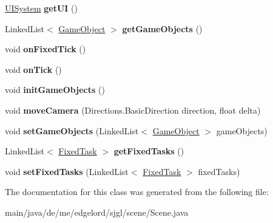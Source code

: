 \begin{DoxyCompactItemize}
\mbox{\label{classde_1_1me_1_1edgelord_1_1sjgl_1_1scene_1_1_scene_a5bc4f5d618ee34be48259de66e0ee12f}} 
\mbox{\hyperlink{classde_1_1me_1_1edgelord_1_1sjgl_1_1ui_1_1_u_i_system}{U\+I\+System}} {\bfseries get\+UI} ()
\item 
\mbox{\label{classde_1_1me_1_1edgelord_1_1sjgl_1_1scene_1_1_scene_a090cfe5919150f584d2a3b18a4631da9}} 
Linked\+List$<$ \mbox{\hyperlink{classde_1_1me_1_1edgelord_1_1sjgl_1_1gameobject_1_1_game_object}{Game\+Object}} $>$ {\bfseries get\+Game\+Objects} ()
\item 
\mbox{\label{classde_1_1me_1_1edgelord_1_1sjgl_1_1scene_1_1_scene_a4c1e106f2d9bc4cb15fc55bd8b204cec}} 
void {\bfseries on\+Fixed\+Tick} ()
\item 
\mbox{\label{classde_1_1me_1_1edgelord_1_1sjgl_1_1scene_1_1_scene_ad83083bf50dc8a921642e61b70fb97bb}} 
void {\bfseries on\+Tick} ()
\item 
\mbox{\label{classde_1_1me_1_1edgelord_1_1sjgl_1_1scene_1_1_scene_aac1110d37956ab61c78e5912aa4da322}} 
void {\bfseries init\+Game\+Objects} ()
\item 
\mbox{\label{classde_1_1me_1_1edgelord_1_1sjgl_1_1scene_1_1_scene_a90d79a8ca3e748c72b0fc9849f409885}} 
void {\bfseries move\+Camera} (Directions.\+Basic\+Direction direction, float delta)
\item 
\mbox{\label{classde_1_1me_1_1edgelord_1_1sjgl_1_1scene_1_1_scene_ae3d9ad47addc8abb9c4d8adcf5429d14}} 
void {\bfseries set\+Game\+Objects} (Linked\+List$<$ \mbox{\hyperlink{classde_1_1me_1_1edgelord_1_1sjgl_1_1gameobject_1_1_game_object}{Game\+Object}} $>$ game\+Objects)
\item 
\mbox{\label{classde_1_1me_1_1edgelord_1_1sjgl_1_1scene_1_1_scene_a49c78b67737988b6636f36b4a773dbbb}} 
Linked\+List$<$ \mbox{\hyperlink{interfacede_1_1me_1_1edgelord_1_1sjgl_1_1gameobject_1_1_fixed_task}{Fixed\+Task}} $>$ {\bfseries get\+Fixed\+Tasks} ()
\item 
\mbox{\label{classde_1_1me_1_1edgelord_1_1sjgl_1_1scene_1_1_scene_a1c11651ff9ca83852eb7a2c3c1f9ff44}} 
void {\bfseries set\+Fixed\+Tasks} (Linked\+List$<$ \mbox{\hyperlink{interfacede_1_1me_1_1edgelord_1_1sjgl_1_1gameobject_1_1_fixed_task}{Fixed\+Task}} $>$ fixed\+Tasks)
\end{DoxyCompactItemize}


The documentation for this class was generated from the following file\+:\begin{DoxyCompactItemize}
\item 
main/java/de/me/edgelord/sjgl/scene/Scene.\+java\end{DoxyCompactItemize}
